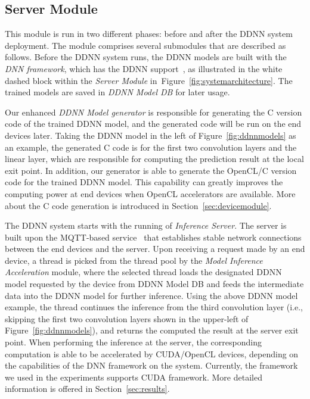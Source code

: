 \documentclass[conference]{IEEEtran}
\def\figurename{Figure}
\def\sectionname{Section}
\begin{document}
\subsection{Server Module}
\label{sec:servermodule}
This module is run in two different phases: before and after the DDNN system deployment. The module comprises several submodules that are described as follows. Before the DDNN system runs, the DDNN models are built with the \emph{DNN framework}, which has the DDNN support~\cite{Teerapittayanon17}, as illustrated in the white dashed block within the \emph{Server Module} in~\figurename~\ref{fig:systemarchitecture}. The trained models are saved in \emph{DDNN Model DB} for later usage.

Our enhanced \emph{DDNN Model generator} is responsible for generating the C version code of the trained DDNN model, and the generated code will be run on the end devices later. Taking the DDNN model in the left of \figurename~\ref{fig:ddnnmodels} as an example, the generated C code is for the first two convolution layers and the linear layer, which are responsible for computing the prediction result at the local exit point. In addition, our generator is able to generate the OpenCL/C version code for the trained DDNN model. This capability can greatly improves the computing power at end devices when OpenCL accelerators are available. More about the C code generation is introduced in \sectionname~\ref{sec:devicemodule}.

The DDNN system starts with the running of \emph{Inference Server}. The server is built upon the MQTT-based service~\cite{aziz2014formal} that establishes stable network connections between the end devices and the server. Upon receiving a request made by an end device, a thread is picked from the thread pool by the \emph{Model Inference Acceleration} module, where the selected thread loads the designated DDNN model requested by the device from DDNN Model DB and feeds the intermediate data into the DDNN model for further inference. Using the above DDNN model example, the thread continues the inference from the third convolution layer (i.e., skipping the first two convolution layers shown in the upper-left of \figurename~\ref{fig:ddnnmodels}), and returns the computed the result at the server exit point. When performing the inference at the server, the corresponding computation is able to be accelerated by CUDA/OpenCL devices, depending on the capabilities of the DNN framework on the system. Currently, the framework we used in the experiments supports CUDA framework. More detailed information is offered in \sectionname~\ref{sec:results}.
\end{document}
